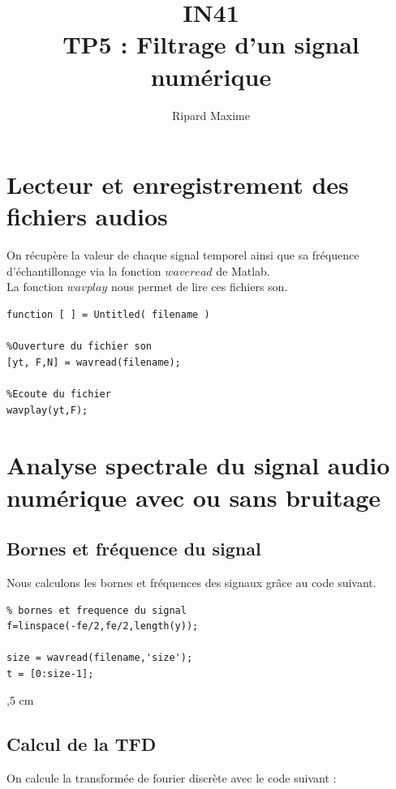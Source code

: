 \documentclass[a4paper, oneside]{report}
\title{IN41 \\TP5 : Filtrage d'un signal num\'erique}
\author{Ripard Maxime}
\begin{document}
  \maketitle
  \newpage{}
  \tableofcontents
  \newpage{}

  \chapter{Lecteur et enregistrement des fichiers audios}
  
On r\'ecup\`ere la valeur de chaque signal temporel ainsi que sa fr\'equence d'\'echantillonage via la fonction $waveread$ de Matlab.\\
La fonction $wavplay$ nous permet de lire ces fichiers son.\\

\begin{lstlisting}
function [ ] = Untitled( filename )

%Ouverture du fichier son
[yt, F,N] = wavread(filename);

%Ecoute du fichier
wavplay(yt,F);
  \end{lstlisting}
    
 \chapter{Analyse spectrale du signal audio num\'erique avec ou sans bruitage}

\section{Bornes et fr\'equence du signal}

Nous calculons les bornes et fr\'equences des signaux gr\^ace au code suivant.

\begin{lstlisting}
% bornes et frequence du signal
f=linspace(-fe/2,fe/2,length(y));

size = wavread(filename,'size');
t = [0:size-1];
\end{lstlisting}

,5 cm

\section{Calcul de la TFD}

On calcule la transform\'ee de fourier discr\`ete avec le code suivant : \\
\end{document}
